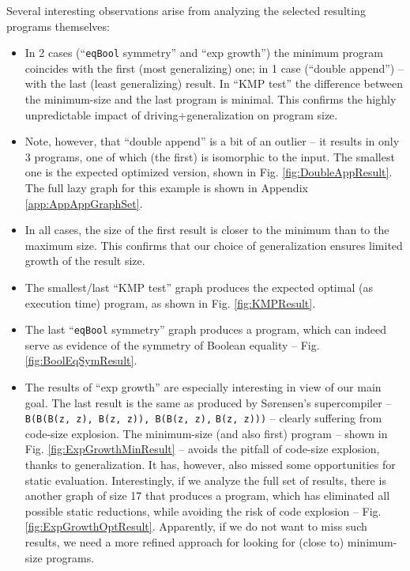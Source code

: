 \documentclass[submission,copyright,creativecommons]{eptcs}
\begin{document}
Several interesting observations arise from analyzing the selected resulting programs themselves:
\begin{itemize}
  \item In 2 cases (``\verb|eqBool| symmetry'' and ``exp growth'') the minimum program coincides with the first (most generalizing) one;
    in 1 case (``double append'') -- with the last (least generalizing) result. 
    In ``KMP test'' the difference between the minimum-size and the last program is minimal.
    This confirms the highly unpredictable impact of driving+generalization on program size.
  \item Note, however, that ``double append'' is a bit of an outlier -- it results in only 3 programs,
    one of which (the first) is isomorphic to the input. The smallest one is the expected
    optimized version, shown in Fig. \ref{fig:DoubleAppResult}.
\ifVptVer
\else    
    The full lazy graph for this example is shown in Appendix \ref{app:AppAppGraphSet}.
\fi    
  \item In all cases, the size of the first result is closer to the minimum than to the maximum size.
    This confirms that our choice of generalization ensures limited growth of the result size.
  \item The smallest/last ``KMP test'' graph produces the expected optimal (as execution time) program,
    as shown in Fig. \ref{fig:KMPResult}.
  \item The last ``\verb|eqBool| symmetry'' graph produces a program, which can indeed serve as evidence of the
    symmetry of Boolean equality -- Fig. \ref{fig:BoolEqSymResult}.
  \item The results of ``exp growth'' are especially interesting in view of our main goal.
    The last result is the same as produced by S{\o}rensen's supercompiler --
    \verb|B(B(B(z, z), B(z, z)), B(B(z, z),| \verb|B(z, z)))| -- clearly suffering from code-size explosion.
    The minimum-size (and also first) program -- shown in Fig. \ref{fig:ExpGrowthMinResult} --
    avoids the pitfall of code-size explosion, thanks to generalization.
    It has, however, also missed some opportunities for static evaluation.
    Interestingly, if we analyze the full set of results, there is another
    graph of size 17 that produces a program, which has eliminated all possible static reductions,
    while avoiding the risk of code explosion -- Fig. \ref{fig:ExpGrowthOptResult}.
    Apparently, if we do not want to miss such results, we need a more refined approach for 
    looking for (close to) minimum-size programs.

\end{itemize}
\end{document}
